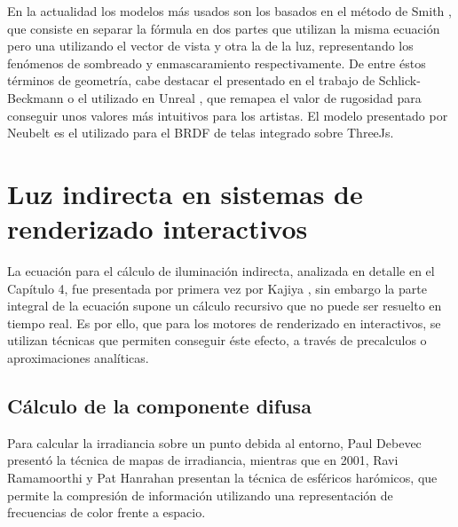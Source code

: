                 
                En la actualidad los modelos m\'as usados son los basados en el m\'etodo de Smith \autocite{smith}, que
                consiste en separar la f\'ormula en dos partes que utilizan la misma ecuaci\'on pero una utilizando el vector de vista
                y otra la de la luz, representando los fen\'omenos de sombreado y enmascaramiento respectivamente. De entre \'estos t\'erminos
                de geometr\'ia, cabe destacar el presentado en el trabajo de Schlick-Beckmann \autocite{schlick} o el utilizado en Unreal \autocite{unreal},
                que remapea el valor de rugosidad para conseguir unos valores m\'as intuitivos para los artistas. El modelo presentado por
                Neubelt \autocite{theorder} es el utilizado para el BRDF de telas integrado sobre ThreeJs.
                
        \section{Luz indirecta en sistemas de renderizado interactivos}
        La ecuaci\'on para el c\'alculo de iluminaci\'on indirecta, analizada en detalle en el Cap\'itulo 4, fue presentada por primera vez
        por Kajiya \autocite{kajiya}, sin embargo la parte integral de la ecuaci\'on supone un c\'alculo recursivo que no puede ser resuelto
        en tiempo real. Es por ello, que para los motores de renderizado en interactivos, se utilizan t\'ecnicas que permiten conseguir
        \'este efecto, a trav\'es de precalculos o aproximaciones anal\'iticas.

            \subsection{C\'alculo de la componente difusa}
            Para calcular la irradiancia sobre un punto debida al entorno, Paul Debevec \autocite{debevec} present\'o la t\'ecnica
            de mapas de irradiancia, mientras que en 2001, Ravi Ramamoorthi y Pat Hanrahan \autocite{sh} presentan la t\'ecnica de esf\'ericos har\'omicos,
            que permite la compresi\'on de informaci\'on utilizando una representaci\'on de frecuencias de color frente a espacio.

